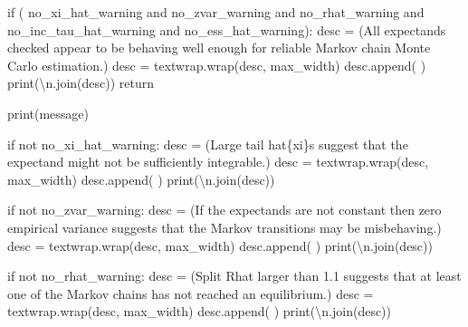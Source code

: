 \documentclass[
  letterpaper,
  DIV=11,
  numbers=noendperiod]{scrartcl}
\newenvironment{Shaded}{\begin{snugshade}}{\end{snugshade}}
\newcommand{\BuiltInTok}[1]{\textcolor[rgb]{0.00,0.23,0.31}{#1}}
\newcommand{\CharTok}[1]{\textcolor[rgb]{0.13,0.47,0.30}{#1}}
\newcommand{\ControlFlowTok}[1]{\textcolor[rgb]{0.00,0.23,0.31}{#1}}
\newcommand{\KeywordTok}[1]{\textcolor[rgb]{0.00,0.23,0.31}{#1}}
\newcommand{\NormalTok}[1]{\textcolor[rgb]{0.00,0.23,0.31}{#1}}
\newcommand{\OperatorTok}[1]{\textcolor[rgb]{0.37,0.37,0.37}{#1}}
\newcommand{\SpecialCharTok}[1]{\textcolor[rgb]{0.37,0.37,0.37}{#1}}
\newcommand{\StringTok}[1]{\textcolor[rgb]{0.13,0.47,0.30}{#1}}
\begin{document}
\begin{Shaded}
\begin{Highlighting}[]
  \ControlFlowTok{if}\NormalTok{ (    no\_xi\_hat\_warning }\KeywordTok{and}\NormalTok{ no\_zvar\_warning}
      \KeywordTok{and}\NormalTok{ no\_rhat\_warning   }\KeywordTok{and}\NormalTok{ no\_inc\_tau\_hat\_warning}
      \KeywordTok{and}\NormalTok{ no\_ess\_hat\_warning):}
\NormalTok{    desc }\OperatorTok{=}\NormalTok{ (}\StringTok{\textquotesingle{}All expectands checked appear to be behaving well enough \textquotesingle{}}
            \StringTok{\textquotesingle{}for reliable Markov chain Monte Carlo estimation.\textquotesingle{}}\NormalTok{)}
\NormalTok{    desc }\OperatorTok{=}\NormalTok{ textwrap.wrap(desc, max\_width)}
\NormalTok{    desc.append(}\StringTok{\textquotesingle{} \textquotesingle{}}\NormalTok{)}
    \BuiltInTok{print}\NormalTok{(}\StringTok{\textquotesingle{}}\CharTok{\textbackslash{}n}\StringTok{\textquotesingle{}}\NormalTok{.join(desc))}
    \ControlFlowTok{return}
  
  \BuiltInTok{print}\NormalTok{(message)}
  
  \ControlFlowTok{if} \KeywordTok{not}\NormalTok{ no\_xi\_hat\_warning:}
\NormalTok{    desc }\OperatorTok{=}\NormalTok{ (}\StringTok{\textquotesingle{}Large tail hat}\SpecialCharTok{\{xi\}}\StringTok{s suggest that the expectand \textquotesingle{}}
            \StringTok{\textquotesingle{}might not be sufficiently integrable.\textquotesingle{}}\NormalTok{)}
\NormalTok{    desc }\OperatorTok{=}\NormalTok{ textwrap.wrap(desc, max\_width)}
\NormalTok{    desc.append(}\StringTok{\textquotesingle{} \textquotesingle{}}\NormalTok{)}
    \BuiltInTok{print}\NormalTok{(}\StringTok{\textquotesingle{}}\CharTok{\textbackslash{}n}\StringTok{\textquotesingle{}}\NormalTok{.join(desc))}
  
  \ControlFlowTok{if} \KeywordTok{not}\NormalTok{ no\_zvar\_warning:}
\NormalTok{    desc }\OperatorTok{=}\NormalTok{ (}\StringTok{\textquotesingle{}If the expectands are not constant then zero empirical \textquotesingle{}}
            \StringTok{\textquotesingle{}variance suggests that the Markov transitions may be \textquotesingle{}}
            \StringTok{\textquotesingle{}misbehaving.\textquotesingle{}}\NormalTok{)}
\NormalTok{    desc }\OperatorTok{=}\NormalTok{ textwrap.wrap(desc, max\_width)}
\NormalTok{    desc.append(}\StringTok{\textquotesingle{} \textquotesingle{}}\NormalTok{)}
    \BuiltInTok{print}\NormalTok{(}\StringTok{\textquotesingle{}}\CharTok{\textbackslash{}n}\StringTok{\textquotesingle{}}\NormalTok{.join(desc))}
  
  \ControlFlowTok{if} \KeywordTok{not}\NormalTok{ no\_rhat\_warning:}
\NormalTok{    desc }\OperatorTok{=}\NormalTok{ (}\StringTok{\textquotesingle{}Split Rhat larger than 1.1 suggests that at least one of \textquotesingle{}}
            \StringTok{\textquotesingle{}the Markov chains has not reached an equilibrium.\textquotesingle{}}\NormalTok{)}
\NormalTok{    desc }\OperatorTok{=}\NormalTok{ textwrap.wrap(desc, max\_width)}
\NormalTok{    desc.append(}\StringTok{\textquotesingle{} \textquotesingle{}}\NormalTok{)}
    \BuiltInTok{print}\NormalTok{(}\StringTok{\textquotesingle{}}\CharTok{\textbackslash{}n}\StringTok{\textquotesingle{}}\NormalTok{.join(desc))}


\end{Highlighting}
\end{Shaded}
\end{document}

